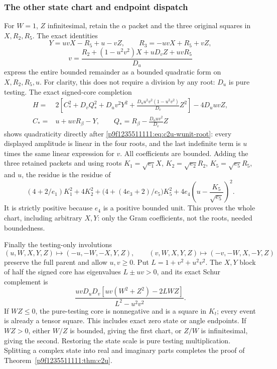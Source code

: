 \subsubsection*{The other state chart and endpoint dispatch}
For $W=1$, $Z$ infinitesimal, retain the $\alpha$ packet and the three
original squares in $X,R_2,R_5$. The exact identities
\[
Y=uvX-R_5+u-vZ,\qquad R_3=-uvX+R_5+vZ,
\]
\begin{equation}
v=\frac{R_2+(1-u^2v^2)X+uD_vZ+uvR_5}{D_u}
\label{p9f1235511111:eq:c2u-wunit-root}
\end{equation}
express the entire bounded remainder as a bounded quadratic form on
$X,R_2,R_5,u$. For clarity, this does not require a division by any
root: $D_u$ is pure testing. The exact signed-core completion
\[
\begin{split}
H={}&2\left[C_*^2+D_vQ_*^2+D_uv^2Y^2
 +\frac{D_uu^2v^2(1-u^2v^2)}{D_v}Z^2\right]-4D_uuvZ,\\
C_*={}&u+uvR_\beta-Y,\qquad
Q_*=R_\beta-\frac{D_uuv^2}{D_v}Z
\end{split}
\]
shows quadraticity directly after \eqref{p9f1235511111:eq:c2u-wunit-root}: every
displayed amplitude is linear in the four roots, and the last indefinite
term is $u$ times the same linear expression for $v$. All coefficients
are bounded. Adding the three retained packets and using roots
$K_1=\sqrt{e_1}X$, $K_2=\sqrt{e_2}R_2$,
$K_5=\sqrt{e_5}R_5$, and $u$, the residue is the residue of
\[
(4+2/e_1)K_1^2+4K_2^2+
\bigl(4+(4e_3+2)/e_5\bigr)K_5^2
+4e_4\left(u-\frac{K_5}{\sqrt{e_5}}\right)^2.
\]
It is strictly positive because $e_4$ is a positive bounded unit.  This
proves the whole chart, including arbitrary $X,Y$: only the Gram
coefficients, not the roots, needed boundedness.

Finally the testing-only involutions
\[
(u,W,X,Y,Z)\mapsto(-u,-W,-X,Y,Z),\qquad
(v,W,X,Y,Z)\mapsto(-v,-W,X,-Y,Z)
\]
preserve the full parent and allow $u,v\ge0$. Put
$L=1+v^2+u^2v^2$. The $X,Y$ block of half the signed core has eigenvalues
$L\pm uv>0$, and its exact Schur complement is
\begin{equation}
 \frac{uvD_uD_v[uv(W^2+Z^2)-2LWZ]}{L^2-u^2v^2}.
\label{p9f1235511111:eq:c2u-core-schur}
\end{equation}
If $WZ\le0$, the pure-testing core is nonnegative and is a square in
$K_t$; every event is already a tensor square. This includes exact zero
state or angle endpoints. If $WZ>0$, either $W/Z$ is bounded, giving
the first chart, or $Z/W$ is infinitesimal, giving the second. Restoring
the state scale is pure testing multiplication. Splitting a complex
state into real and imaginary parts completes the proof of
Theorem~\ref{p9f1235511111:thm:c2u}.

